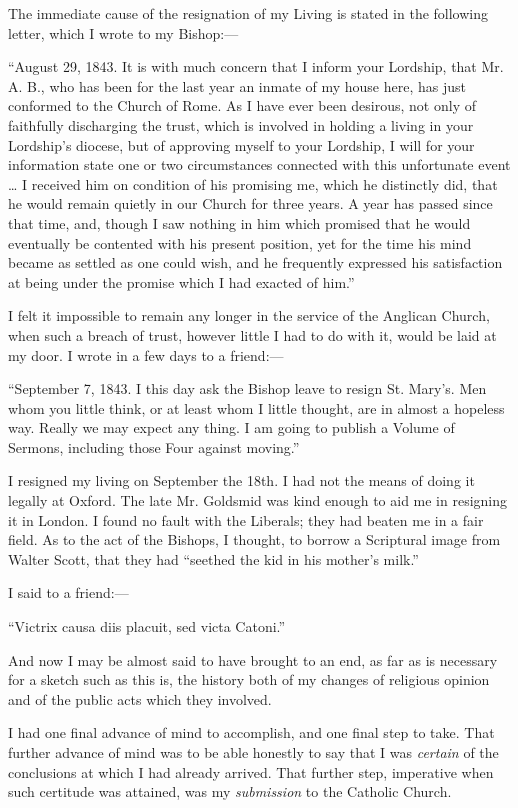 The immediate cause of the resignation of my Living is stated in the
following letter, which I wrote to my Bishop:—

``August 29, 1843. It is with much concern that I inform your
Lordship, that Mr. A. B., who has been for the last year an inmate of my
house here, has just conformed to the Church of Rome. As I have ever
been desirous, not only of faithfully discharging the trust, which is
involved in holding a living in your Lordship's diocese, but of
approving myself to your Lordship, I will for your information
state one or two circumstances connected with this unfortunate event …
I received him on condition of his promising me, which he distinctly
did, that he would remain quietly in our Church for three years. A year
has passed since that time, and, though I saw nothing in him which
promised that he would eventually be contented with his present
position, yet for the time his mind became as settled as one could wish,
and he frequently expressed his satisfaction at being under the promise
which I had exacted of him.''

I felt it impossible to remain any longer in the service of the
Anglican Church, when such a breach of trust, however little I had to do
with it, would be laid at my door. I wrote in a few days to a friend:—

``September 7, 1843. I this day ask the Bishop leave to resign
St. Mary's. Men whom you little think, or at least whom I little
thought, are in almost a hopeless way. Really we may expect any thing. I
am going to publish a Volume of Sermons, including those Four against
moving.''

I resigned my living on September the 18th. I had not the
means of doing it legally at Oxford. The late Mr. Goldsmid was kind
enough to aid me in resigning it in London. I found no fault with the Liberals;
they had beaten me in a fair field. As to the act of the Bishops, I
thought, to borrow a Scriptural
image from Walter Scott, that they had
``seethed the kid in his mother's milk.''

I said to a friend:—

``Victrix causa diis placuit, sed victa Catoni.''

And now I may be almost said to have brought to an
end, as far as is necessary for a sketch such
as this is, the history
both of my changes of religious opinion and of the public
acts which they involved.

I had one final advance
of mind to accomplish, and one final step to take. That further advance of mind
was to be able honestly
to say that I was \emph{certain} of the conclusions at which
I had already arrived. That further step, imperative when such certitude
was attained, was my \emph{submission}
to the Catholic Church.

